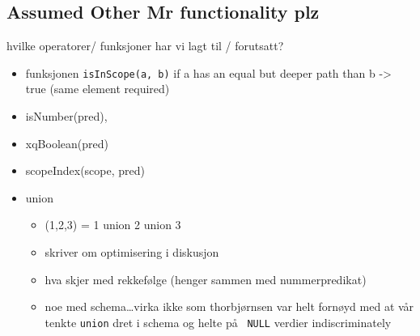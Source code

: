 \subsection{Assumed Other Mr functionality plz}
\label{sect:method:marsAddedOperators}
hvilke operatorer/ funksjoner har vi lagt til / forutsatt?
\begin{itemize}
  	\item funksjonen \verb!isInScope(a, b)! if a has an equal but deeper path than
		b -> true (same element required) 
	\item isNumber(pred), 
	\item xqBoolean(pred)
	\item scopeIndex(scope, pred)
	\item union
		\begin{itemize}
			  \item (1,2,3) = 1 union 2 union 3 
			  \item skriver om optimisering i diskusjon
			  \item hva skjer med rekkef\o lge (henger sammen med nummerpredikat)
			  \item noe med schema\ldots virka ikke som thorbj\o rnsen var helt forn\o yd
				  med at v\aa r tenkte \texttt{union} dret i schema og helte p\aa~
				  \texttt{NULL} verdier indiscriminately
        \end{itemize}	
\end{itemize}
